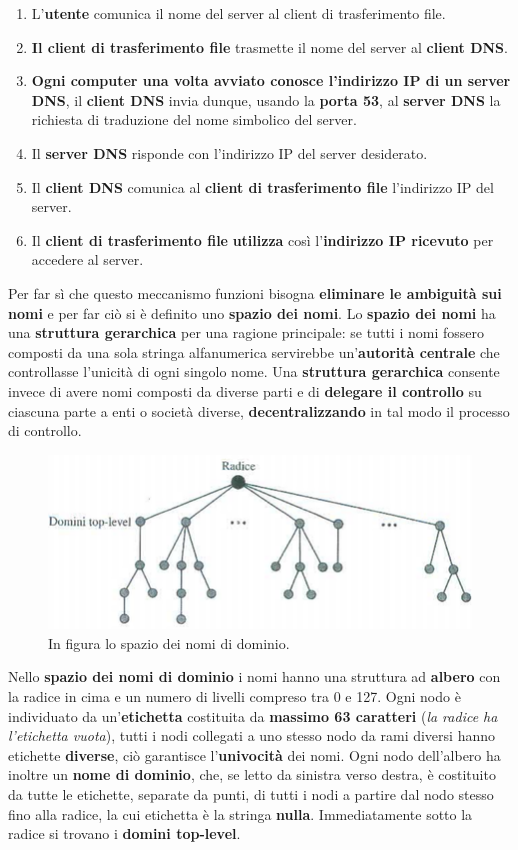 \documentclass[11pt,a4paper,oneside]{book}
\theoremstyle{definition}
\begin{document}
\pagebreak

\begin{enumerate}
	\item L'\textbf{utente} comunica il nome del server al client di trasferimento file.
	\item \textbf{Il client di trasferimento file} trasmette il nome del server al \textbf{client DNS}.
	\item \textbf{Ogni computer una volta avviato conosce l'indirizzo IP di un server DNS}, il \textbf{client DNS} invia dunque, usando la \textbf{porta 53}, al \textbf{server DNS} la richiesta di traduzione del nome simbolico del server.
	\item Il \textbf{server DNS} risponde con l'indirizzo IP del server desiderato.
	\item Il \textbf{client DNS} comunica al \textbf{client di trasferimento file} l'indirizzo IP del server.
	\item Il \textbf{client di trasferimento file} \textbf{utilizza} così l'\textbf{indirizzo IP ricevuto} per accedere al server.
\end{enumerate}
Per far sì che questo meccanismo funzioni bisogna \textbf{eliminare le ambiguità sui nomi} e per far ciò si è definito uno \textbf{spazio dei nomi}. Lo \textbf{spazio dei nomi} ha una \textbf{struttura gerarchica} per una ragione principale: se tutti i nomi fossero composti da una sola stringa alfanumerica servirebbe un'\textbf{autorità centrale} che controllasse l'unicità di ogni singolo nome. Una \textbf{struttura gerarchica} consente invece di avere nomi composti da diverse parti e di \textbf{delegare il controllo} su ciascuna parte a enti o società diverse, \textbf{decentralizzando} in tal modo il processo di controllo.
\begin{figure}[!h]
	\includegraphics[scale=0.7]{Immagini/DNSpace.png}
	\centering
	\caption{In figura lo spazio dei nomi di dominio.}
\end{figure}\newline
Nello \textbf{spazio dei nomi di dominio} i nomi hanno una struttura ad \textbf{albero} con la radice in cima e un numero di livelli compreso tra 0 e 127. Ogni nodo è individuato da un'\textbf{etichetta} costituita da \textbf{massimo 63 caratteri} (\textit{la radice ha l'etichetta vuota}), tutti i nodi collegati a uno stesso nodo da rami diversi hanno etichette \textbf{diverse}, ciò garantisce l'\textbf{univocità} dei nomi. Ogni nodo dell'albero ha inoltre un \textbf{nome di dominio}, che, se letto da sinistra verso destra, è costituito da tutte le etichette, separate da punti, di tutti i nodi a partire dal nodo stesso fino alla radice, la cui etichetta è la stringa \textbf{nulla}. Immediatamente sotto la radice si trovano i \textbf{domini top-level}.
\end{document}
